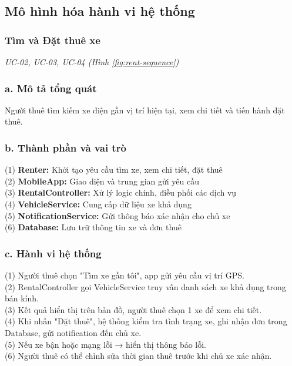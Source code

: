 \newpage
\subsection{Mô hình hóa hành vi hệ thống}
\subsubsection{Tìm và Đặt thuê xe}
\small\textit{UC-02, UC-03, UC-04 (Hình \ref{fig:rent-sequence})}
\subsubsection*{a. Mô tả tổng quát}
Người thuê tìm kiếm xe điện gần vị trí hiện tại, xem chi tiết và tiến hành đặt thuê.
\subsubsection*{b. Thành phần và vai trò}
(1) \textbf{Renter:} Khởi tạo yêu cầu tìm xe, xem chi tiết, đặt thuê \\
(2) \textbf{MobileApp:} Giao diện và trung gian gửi yêu cầu \\
(3) \textbf{RentalController:} Xử lý logic chính, điều phối các dịch vụ \\
(4) \textbf{VehicleService:} Cung cấp dữ liệu xe khả dụng \\
(5) \textbf{NotificationService:} Gửi thông báo xác nhận cho chủ xe \\
(6) \textbf{Database:} Lưu trữ thông tin xe và đơn thuê
\subsubsection*{c. Hành vi hệ thống}
(1) Người thuê chọn "Tìm xe gần tôi", app gửi yêu cầu vị trí GPS. \\
(2) RentalController gọi VehicleService truy vấn danh sách xe khả dụng trong bán kính. \\
(3) Kết quả hiển thị trên bản đồ, người thuê chọn 1 xe để xem chi tiết. \\
(4) Khi nhấn "Đặt thuê", hệ thống kiểm tra tình trạng xe, ghi nhận đơn trong Database, gửi notification đến chủ xe. \\
(5) Nếu xe bận hoặc mạng lỗi → hiển thị thông báo lỗi. \\
(6) Người thuê có thể chỉnh sửa thời gian thuê trước khi chủ xe xác nhận.
